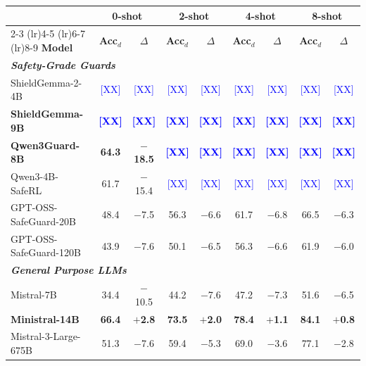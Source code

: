 \begin{table}[t]
\centering
\scriptsize
\begin{tabular}{lcccccccc}
\toprule
 & \multicolumn{2}{c}{\textbf{0-shot}} & \multicolumn{2}{c}{\textbf{2-shot}} & \multicolumn{2}{c}{\textbf{4-shot}} & \multicolumn{2}{c}{\textbf{8-shot}} \\
\cmidrule(lr){2-3} \cmidrule(lr){4-5} \cmidrule(lr){6-7} \cmidrule(lr){8-9}
\textbf{Model} & \textbf{Acc$_d$} & \textbf{$\Delta$} & \textbf{Acc$_d$} & \textbf{$\Delta$} & \textbf{Acc$_d$} & \textbf{$\Delta$} & \textbf{Acc$_d$} & \textbf{$\Delta$} \\
\midrule
\multicolumn{9}{l}{\textbf{\textit{Safety-Grade Guards}}} \\
ShieldGemma-2-4B & \textcolor{blue}{[XX]} & \textcolor{blue}{[XX]} & \textcolor{blue}{[XX]} & \textcolor{blue}{[XX]} & \textcolor{blue}{[XX]} & \textcolor{blue}{[XX]} & \textcolor{blue}{[XX]} & \textcolor{blue}{[XX]} \\
\textbf{ShieldGemma-9B} & \textcolor{blue}{\textbf{[XX]}} & \textcolor{blue}{\textbf{[XX]}} & \textcolor{blue}{\textbf{[XX]}} & \textcolor{blue}{\textbf{[XX]}} & \textcolor{blue}{\textbf{[XX]}} & \textcolor{blue}{\textbf{[XX]}} & \textcolor{blue}{\textbf{[XX]}} & \textcolor{blue}{\textbf{[XX]}} \\
\textbf{Qwen3Guard-8B} & \textbf{64.3} & \textbf{$-$18.5} & \textcolor{blue}{\textbf{[XX]}} & \textcolor{blue}{\textbf{[XX]}} & \textcolor{blue}{\textbf{[XX]}} & \textcolor{blue}{\textbf{[XX]}} & \textcolor{blue}{\textbf{[XX]}} & \textcolor{blue}{\textbf{[XX]}} \\
Qwen3-4B-SafeRL & 61.7 & $-$15.4 & \textcolor{blue}{[XX]} & \textcolor{blue}{[XX]} & \textcolor{blue}{[XX]} & \textcolor{blue}{[XX]} & \textcolor{blue}{[XX]} & \textcolor{blue}{[XX]} \\
GPT-OSS-SafeGuard-20B & 48.4 & $-$7.5 & 56.3 & $-$6.6 & 61.7 & $-$6.8 & 66.5 & $-$6.3 \\
GPT-OSS-SafeGuard-120B & 43.9 & $-$7.6 & 50.1 & $-$6.5 & 56.3 & $-$6.6 & 61.9 & $-$6.0 \\
\midrule[\lightrulewidth]
\multicolumn{9}{l}{\textbf{\textit{General Purpose LLMs}}} \\
Mistral-7B & 34.4 & $-$10.5 & 44.2 & $-$7.6 & 47.2 & $-$7.3 & 51.6 & $-$6.5 \\
\textbf{Ministral-14B} & \textbf{66.4} & \textbf{$+$2.8} & \textbf{73.5} & \textbf{$+$2.0} & \textbf{78.4} & \textbf{$+$1.1} & \textbf{84.1} & \textbf{$+$0.8} \\
Mistral-3-Large-675B & 51.3 & $-$7.6 & 59.4 & $-$5.3 & 69.0 & $-$3.6 & 77.1 & $-$2.8 \\

\end{tabular}
\end{table}
